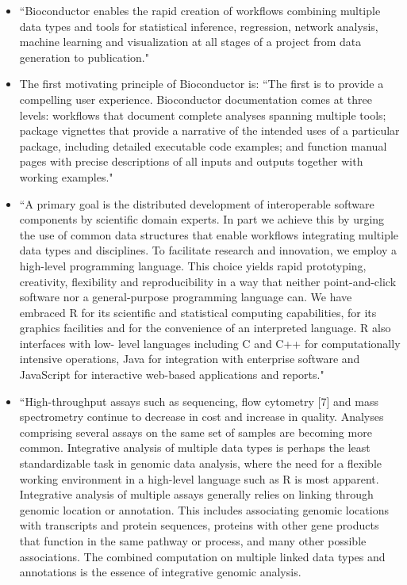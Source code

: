 \documentclass[pdftex,english,11pt,parskip=half]{scrartcl}
\begin{document}
\begin{itemize}
\item ``Bioconductor enables the rapid creation of workflows combining multiple data types and tools for statistical inference, regression, network analysis, machine learning and visualization at all stages of a project from data generation to publication." \cite{huber2015orchestrating}
\item The first motivating principle of Bioconductor is: ``The first is to provide a compelling user experience. Bioconductor documentation comes at three levels: workflows that document complete analyses spanning multiple tools; package vignettes that provide a narrative of the intended uses of a particular package, including detailed executable code examples; and function manual pages with precise descriptions of all inputs and outputs together with working examples." \cite{huber2015orchestrating}
\item ``A primary goal is the distributed development of interoperable software components by scientific domain experts. In part we achieve this by urging the use of common data structures that enable workflows integrating multiple data types and disciplines. To facilitate research and innovation, we employ a high-level programming language. This choice yields rapid prototyping, creativity, flexibility and reproducibility in a way that neither point-and-click software nor a general-purpose programming language can. We have embraced R for its scientific and statistical computing capabilities, for its graphics facilities and for the convenience of an interpreted language. R also interfaces with low- level languages including C and C++ for computationally intensive operations, Java for integration with enterprise software and JavaScript for interactive web-based applications and reports." \cite{huber2015orchestrating}
\item ``High-throughput assays such as sequencing, flow cytometry [7] and mass spectrometry continue to decrease in cost and increase in quality. Analyses comprising several assays on the same set of samples are becoming more common. Integrative analysis of multiple data types is perhaps the least standardizable task in genomic data analysis, where the need for a flexible working environment in a high-level language such as R is most apparent.
Integrative analysis of multiple assays generally relies on linking through genomic location or annotation. This includes associating genomic locations with transcripts and protein sequences, proteins with other gene products that function in the same pathway or process, and many other possible associations. The combined computation on multiple linked data types and annotations is the essence of integrative genomic analysis.

\end{itemize}
\end{document}
